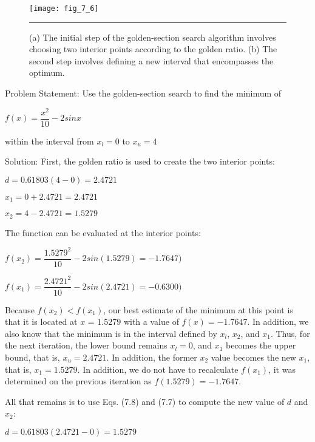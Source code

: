 \documentclass[../main.tex]{subfiles}
\begin{document}
\begin{figure}[H]
	\centering
	\texttt{[image: fig\_7\_6]}
	\caption{\textsf{(a) The initial step of the golden-section search algorithm involves choosing two interior points
	according to the golden ratio. (b) The second step involves defining a new interval that
	encompasses the optimum.}}
	\color{cyan} \rule{\linewidth}{0,5mm}
	\label{fig:fig_7_6}
\end{figure}



\begin{exmp}
	\color{cyan}{Golden-Section Search}
	\color{black}
	\smallskip
	
	\noindent Problem Statement:
	Use the golden-section search to find the minimum of

	$f(x)=\dfrac{x^2}{10}-2sin{x}$

	\noindent within the interval from $x_l=0$ to $x_u=4$

	\noindent Solution: First, the golden ratio is used to create the two interior points:
	\medskip

	$d = 0.61803(4 - 0) = 2.4721$
	\medskip

	$x_1 = 0 + 2.4721 = 2.4721$
	\medskip

	$x_2 = 4 - 2.4721 = 1.5279$
	\medskip

	\noindent The function can be evaluated at the interior points:
	\medskip

	$f(x_2) = \dfrac{1.5279^2}{10}-2sin(1.5279) = -1.7647)$
	\medskip

	$f(x_1) = \dfrac{2.4721^2}{10}-2sin(2.4721) = -0.6300)$
	\medskip

	Because $f(x_2)< f(x_1)$, our best estimate of the minimum at this point is that it is
	located at $x$ = 1.5279 with a value of $f(x) = -1.7647$. In addition, we also know that the
	minimum is in the interval defined by $x_l$, $x_2$, and $x_1$. Thus, for the next iteration, the lower
	bound remains $x_l = 0$, and $x_1$ becomes the upper bound, that is, $x_u = 2.4721$. In addition,
	the former $x_2$ value becomes the new $x_1$, that is, $x_1 = 1.5279$. In addition, we do not have to
	recalculate $f(x_1)$, it was determined on the previous iteration as $f(1.5279)=-1.7647$.

	All that remains is to use Eqs. (7.8) and (7.7) to compute the new value of $d$ and $x_2$:
	\medskip

	$d = 0.61803(2.4721 - 0) = 1.5279$
	\medskip


\end{exmp}
\end{document}
